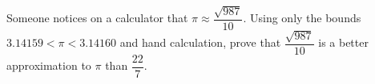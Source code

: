 Someone notices on a calculator that $\pi\approx\dfrac{\sqrt{987}}{10}$. Using only the bounds $3.14159<\pi<3.14160$ and hand calculation, prove that $\dfrac{\sqrt{987}}{10}$ is a better approximation to $\pi$ than $\dfrac{22}{7}$.
